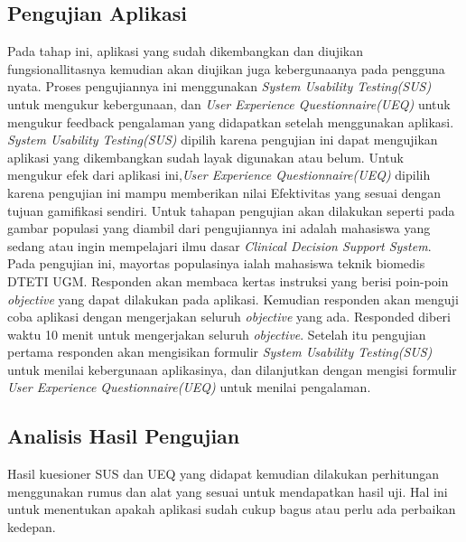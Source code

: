 \subsection{Pengujian Aplikasi}
Pada tahap ini, aplikasi yang sudah dikembangkan dan diujikan fungsionallitasnya kemudian akan diujikan juga kebergunaanya pada pengguna nyata.
Proses pengujiannya ini menggunakan \textit{System Usability Testing(SUS)} untuk mengukur kebergunaan, dan \textit{User Experience Questionnaire(UEQ)} untuk mengukur feedback pengalaman yang didapatkan setelah menggunakan aplikasi.
\textit{System Usability Testing(SUS)} dipilih karena pengujian ini dapat mengujikan aplikasi yang dikembangkan sudah layak digunakan atau belum.
Untuk mengukur efek dari aplikasi ini,\textit{User Experience Questionnaire(UEQ)} dipilih karena pengujian ini mampu memberikan nilai Efektivitas yang sesuai dengan tujuan gamifikasi sendiri. 
Untuk tahapan pengujian akan dilakukan seperti pada gambar 
populasi yang diambil dari pengujiannya ini adalah mahasiswa yang sedang atau ingin mempelajari ilmu dasar \textit{Clinical Decision Support System}.
Pada pengujian ini, mayortas populasinya ialah mahasiswa teknik biomedis DTETI UGM.
Responden akan membaca kertas instruksi yang berisi poin-poin \textit{objective} yang dapat dilakukan pada aplikasi.
Kemudian responden akan menguji coba aplikasi dengan mengerjakan seluruh \textit{objective} yang ada. Responded diberi waktu 10 menit untuk mengerjakan seluruh \textit{objective}.
Setelah itu pengujian pertama responden akan mengisikan formulir \textit{System Usability Testing(SUS)} untuk menilai kebergunaan aplikasinya, dan dilanjutkan dengan mengisi formulir \textit{User Experience Questionnaire(UEQ)} untuk menilai pengalaman.
\subsection{Analisis Hasil Pengujian}
Hasil kuesioner SUS dan UEQ yang didapat kemudian dilakukan 
perhitungan menggunakan rumus dan alat yang sesuai untuk mendapatkan hasil 
uji. Hal ini untuk menentukan apakah aplikasi sudah cukup bagus atau perlu ada 
perbaikan kedepan. 
